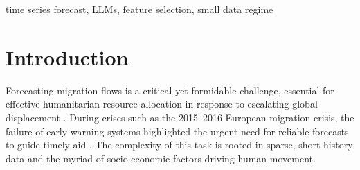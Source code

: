 \documentclass[conference]{IEEEtran}
\begin{document}
\maketitle

\begin{abstract}
Accurate forecasting of migration flows is critical for humanitarian aid but is challenged by sparse, short-history data. Current methods for selecting exogenous variables (features) rely on subjective domain knowledge or on data-driven approaches that fail in small data regimes. To address this, we propose a novel method that leverages the internal knowledge of Large Language Models (LLMs) to guide feature selection for time series forecasting. Our approach prompts an LLM to identify the most contextually relevant features from a candidate list, a process we enhance using Retrieval-Augmented Generation (RAG) to incorporate up-to-date, domain-specific knowledge. We evaluate our method on European migration data (FRONTEX, 2019–2024) and standard forecasting benchmarks. Our experiments show that LLM-guided feature selection consistently improves forecast accuracy over models using the full feature set and outperforms traditional data-driven techniques in data-scarce scenarios. Our work demonstrates the potential of LLMs for knowledge-driven feature selection in domains limited by data availability.
\end{abstract}

\begin{IEEEkeywords}
time series forecast, LLMs, feature selection, small data regime
\end{IEEEkeywords}

\section{Introduction}
Forecasting migration flows is a critical yet formidable challenge, essential for effective humanitarian resource allocation in response to escalating global displacement \cite{world_migration_report}. During crises such as the 2015–2016 European migration crisis, the failure of early warning systems highlighted the urgent need for reliable forecasts to guide timely aid \cite{mcmahon2021, napierala2022}. The complexity of this task is rooted in sparse, short-history data and the myriad of socio-economic factors driving human movement.
\end{document}
